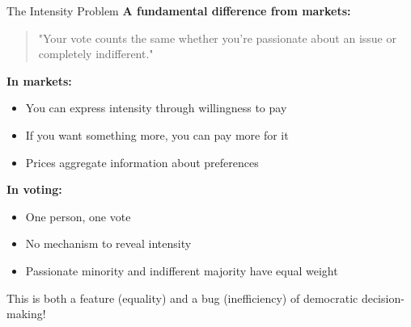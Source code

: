 \documentclass[10pt]{beamer}
\begin{document}
\begin{frame}{The Intensity Problem}
\textbf{A fundamental difference from markets:}


\begin{quote}
"Your vote counts the same whether you're passionate about an issue or completely indifferent."
\end{quote}



\textbf{In markets:}
\begin{itemize}
\item You can express intensity through willingness to pay
\item If you want something more, you can pay more for it
\item Prices aggregate information about preferences
\end{itemize}



\textbf{In voting:}
\begin{itemize}
\item One person, one vote
\item \alert{No mechanism to reveal intensity}
\item Passionate minority and indifferent majority have equal weight
\end{itemize}



This is both a feature (equality) and a bug (inefficiency) of democratic decision-making!
\end{frame}
\end{document}

